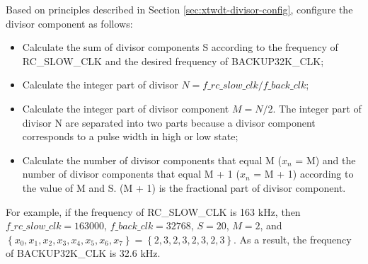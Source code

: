 \documentclass[main\_\_EN.tex]{subfiles}
\begin{document}
Based on principles described in Section \ref{sec:xtwdt-divisor-config}, configure the divisor component as follows:
\begin{itemize}
    \item Calculate the sum of divisor components S according to the frequency of RC\_SLOW\_CLK and the desired frequency of BACKUP32K\_CLK;
    \item Calculate the integer part of divisor \begin{math}N = f\_rc\_slow\_clk / f\_back\_clk\end{math};
    \item Calculate the integer part of divisor component \begin{math}M = N / 2\end{math}. The integer part of divisor N are separated into two parts because a divisor component corresponds to a pulse width in high or low state;
    \item Calculate the number of divisor components that equal M (\begin{math}x_n\end{math} = M) and the number of divisor components that equal M + 1 (\begin{math}x_n\end{math} = M + 1)  according to the value of M and S. (M + 1) is the fractional part of divisor component.
    

\end{itemize}

For example, if the frequency of RC\_SLOW\_CLK is 163 kHz, then \begin{math}f\_rc\_slow\_clk = 163000\end{math}, \begin{math}f\_back\_clk = 32768\end{math}, \begin{math}S = 20\end{math}, \begin{math}M = 2 \end{math}, and \begin{math} \left\{x_0, x_1, x_2, x_3, x_4, x_5, x_6, x_7\right\} = \left\{2, 3, 2, 3, 2, 3, 2, 3\right\}\end{math}. As a result, the frequency of BACKUP32K\_CLK is 32.6 kHz.
\end{document}
